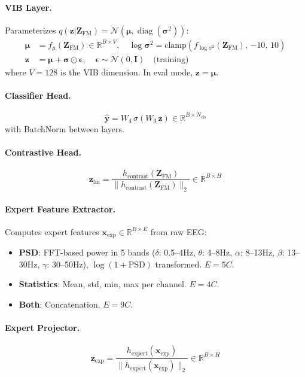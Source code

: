 \documentclass{article}
\DeclareMathOperator{\diag}{diag}
\newcommand{\R}{\mathbb{R}}
\newcommand{\mN}{\mathcal{N}}
\newcommand{\bz}{\bm{z}}
\newcommand{\bmu}{\bm{\mu}}
\newcommand{\bsigma}{\bm{\sigma}}
\begin{document}
\paragraph{VIB Layer.} Parameterizes $q(\bz | \bm{Z}_\text{FM}) = \mN(\bmu, \diag(\bsigma^2))$:
\begin{align}
\bmu &= f_\mu(\bm{Z}_\text{FM}) \in \R^{B \times V}, \quad
\log \bsigma^2 = \text{clamp}(f_{\log\sigma^2}(\bm{Z}_\text{FM}),\, {-10},\, 10) \\
\bz &= \bmu + \bsigma \odot \bm{\epsilon}, \quad \bm{\epsilon} \sim \mN(0, \bm{I}) \quad \text{(training)}
\end{align}
where $V = 128$ is the VIB dimension. In eval mode, $\bz = \bmu$.

\paragraph{Classifier Head.}
\begin{equation}
\hat{\bm{y}} = W_4\, \sigma(W_3\, \bz) \in \R^{B \times N_\text{cls}}
\end{equation}
with BatchNorm between layers.

\paragraph{Contrastive Head.}
\begin{equation}
\bz_\text{fm} = \frac{h_\text{contrast}(\bm{Z}_\text{FM})}{\|h_\text{contrast}(\bm{Z}_\text{FM})\|_2} \in \R^{B \times H}
\end{equation}

\paragraph{Expert Feature Extractor.}
Computes expert features $\bm{x}_\text{exp} \in \R^{B \times E}$ from raw EEG:
\begin{itemize}
\item \textbf{PSD}: FFT-based power in 5 bands ($\delta$: 0.5--4Hz, $\theta$: 4--8Hz, $\alpha$: 8--13Hz, $\beta$: 13--30Hz, $\gamma$: 30--50Hz), $\log(1 + \text{PSD})$ transformed. $E = 5C$.
\item \textbf{Statistics}: Mean, std, min, max per channel. $E = 4C$.
\item \textbf{Both}: Concatenation. $E = 9C$.
\end{itemize}

\paragraph{Expert Projector.}
\begin{equation}
\bz_\text{exp} = \frac{h_\text{expert}(\bm{x}_\text{exp})}{\|h_\text{expert}(\bm{x}_\text{exp})\|_2} \in \R^{B \times H}
\end{equation}
\end{document}
